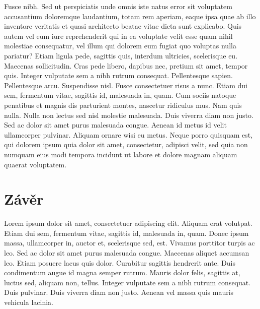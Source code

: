 \documentclass[czech,master,dept460,male,cpp,cpdeclaration]{diploma}
\begin{document}
Fusce nibh. Sed ut perspiciatis unde omnis iste natus error sit voluptatem accusantium doloremque laudantium, totam rem aperiam, eaque ipsa quae ab illo inventore veritatis et quasi architecto beatae vitae dicta sunt explicabo. Quis autem vel eum iure reprehenderit qui in ea voluptate velit esse quam nihil molestiae consequatur, vel illum qui dolorem eum fugiat quo voluptas nulla pariatur? Etiam ligula pede, sagittis quis, interdum ultricies, scelerisque eu. Maecenas sollicitudin. Cras pede libero, dapibus nec, pretium sit amet, tempor quis. Integer vulputate sem a nibh rutrum consequat. Pellentesque sapien. Pellentesque arcu. Suspendisse nisl. Fusce consectetuer risus a nunc. Etiam dui sem, fermentum vitae, sagittis id, malesuada in, quam. Cum sociis natoque penatibus et magnis dis parturient montes, nascetur ridiculus mus. Nam quis nulla. Nulla non lectus sed nisl molestie malesuada. Duis viverra diam non justo. Sed ac dolor sit amet purus malesuada congue. Aenean id metus id velit ullamcorper pulvinar. Aliquam ornare wisi eu metus. Neque porro quisquam est, qui dolorem ipsum quia dolor sit amet, consectetur, adipisci velit, sed quia non numquam eius modi tempora incidunt ut labore et dolore magnam aliquam quaerat voluptatem.

\section{Závěr}
Lorem ipsum dolor sit amet, consectetuer adipiscing elit. Aliquam erat volutpat. Etiam dui sem, fermentum vitae, sagittis id, malesuada in, quam. Donec ipsum massa, ullamcorper in, auctor et, scelerisque sed, est. Vivamus porttitor turpis ac leo. Sed ac dolor sit amet purus malesuada congue. Maecenas aliquet accumsan leo. Etiam posuere lacus quis dolor. Curabitur sagittis hendrerit ante. Duis condimentum augue id magna semper rutrum. Mauris dolor felis, sagittis at, luctus sed, aliquam non, tellus. Integer vulputate sem a nibh rutrum consequat. Duis pulvinar. Duis viverra diam non justo. Aenean vel massa quis mauris vehicula lacinia.
\end{document}
